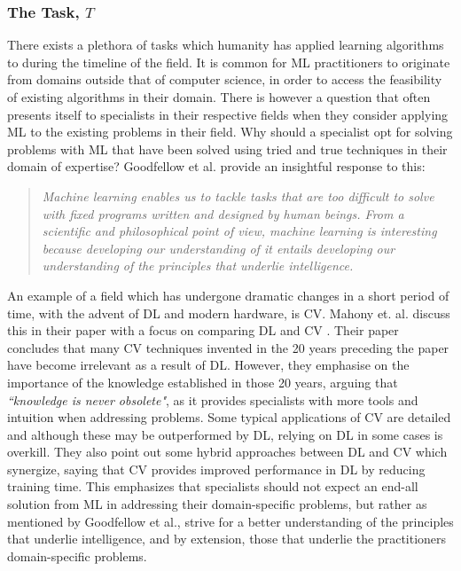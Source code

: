 \subsubsection{The Task, $T$}
There exists a plethora of tasks which humanity has applied learning algorithms
to during the timeline of the field. It is common for \gls{ML} practitioners to
originate from domains outside that of computer science, in order to access the
feasibility of existing algorithms in their domain. There is however a question
that often presents itself to specialists in their respective fields when they
consider applying \gls{ML} to the existing problems in their field. Why should a
specialist opt for solving problems with \gls{ML} that have been solved using tried
and true techniques in their domain of expertise? Goodfellow et al.
\cite{Goodfellow-et-al-2016} provide an insightful response to this:

\begin{quotation}
    \textit{
        Machine learning enables us to tackle tasks that are too difficult to
        solve with fixed programs written and designed by human beings. From a
        scientific and philosophical point of view, machine learning is
        interesting because developing our understanding of it entails
        developing our understanding of the principles that underlie
        intelligence.
    }
\end{quotation}
An example of a field which has undergone dramatic changes in a short period of
time, with the advent of \gls{DL} and modern hardware, is \gls{CV}. Mahony et. al.
discuss this in their paper with a focus on comparing \gls{DL} and \gls{CV}
\cite{Mahony-et-al-2020}. Their paper concludes that many \gls{CV} techniques
invented in the 20 years preceding the paper have become irrelevant as a result
of \gls{DL}. However, they emphasise on the importance of the knowledge
established in those 20 years, arguing that \textit{``knowledge is never
obsolete"}, as it provides specialists with more tools and intuition when
addressing problems. Some typical applications of \gls{CV} are detailed and
although these may be outperformed by \gls{DL}, relying on \gls{DL} in some cases
is overkill. They also point out some hybrid approaches between \gls{DL} and
\gls{CV} which synergize, saying that \gls{CV} provides improved performance in
\gls{DL} by reducing training time. This emphasizes that specialists should not
expect an end-all solution from \gls{ML} in addressing their domain-specific
problems, but rather as mentioned by Goodfellow et al., strive for a better
understanding of the principles that underlie intelligence, and by extension,
those that underlie the practitioners domain-specific problems.

